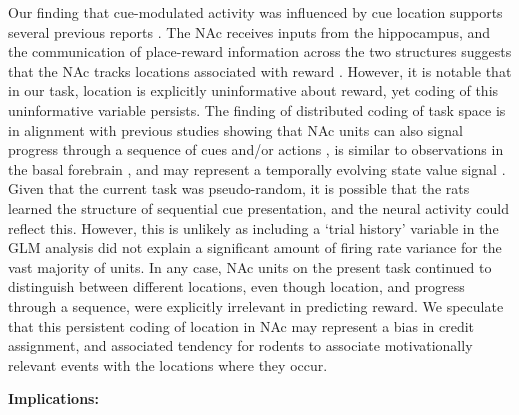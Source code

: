 \documentclass[11pt]{article}
\let\cite=\citep
\begin{document}
Our finding that cue-modulated activity was influenced by cue location supports several previous reports \cite{Lavoie1994,Wiener2003,Mulder2005,Strait2016}. The NAc receives inputs from the hippocampus, and the communication of place-reward information across the two structures suggests that the NAc tracks locations associated with reward \cite{Tabuchi2000,Pennartz2004,Lansink2008,Lansink2009,VanderMeer2011,Lansink2016,Sjulson2017}. However, it is notable that in our task, location is explicitly uninformative about reward, yet coding of this uninformative variable persists. The finding of distributed coding of task space is in alignment with previous studies showing that NAc units can also signal progress through a sequence of cues and/or actions \cite{Shidara1998,Mulder2004,Khamassi2008,Berke2009,Lansink2012,Atallah2014}, is similar to observations in the basal forebrain \cite{Tingley2018}, and may represent a temporally evolving state value signal \cite{Pennartz2011,Hamid2016}. Given that the current task was pseudo-random, it is possible that the rats learned the structure of sequential cue presentation, and the neural activity could reflect this. However, this is unlikely as including a ‘trial history’ variable in the GLM analysis did not explain a significant amount of firing rate variance for the vast majority of units. In any case, NAc units on the present task continued to distinguish between different locations, even though location, and progress through a sequence, were explicitly irrelevant in predicting reward. We speculate that this persistent coding of location in NAc may represent a bias in credit assignment, and associated tendency for rodents to associate motivationally relevant events with the locations where they occur.

{\bf Implications:}
\end{document}

